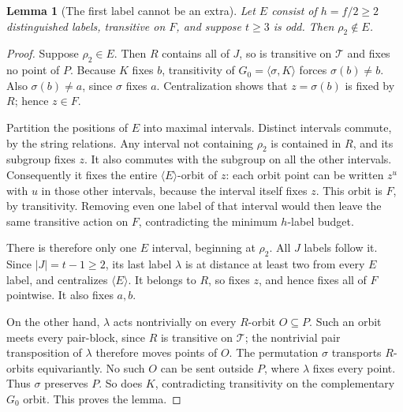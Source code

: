 \documentclass[11pt,a4paper]{article}
\newtheorem{lemma}{Lemma}
\newcommand{\gen}[1]{\langle#1\rangle}
\begin{document}
\begin{lemma}[The first label cannot be an extra]\label{near}
Let $E$ consist of $h=f/2\geq2$ distinguished labels, transitive on $F$,
and suppose $t\geq3$ is odd.
Then $\rho_2\notin E$.
\end{lemma}
\begin{proof}
Suppose $\rho_2\in E$. Then $R$ contains all of $J$, so is transitive
on $\mathcal T$ and fixes no point of $P$. Because $K$ fixes $b$,
transitivity of $G_0=\gen{\sigma,K}$ forces $\sigma(b)\ne b$.
Also $\sigma(b)\ne a$, since $\sigma$ fixes $a$. Centralization
shows that $z=\sigma(b)$ is fixed by $R$; hence $z\in F$.

Partition the positions of $E$ into maximal intervals. Distinct
intervals commute, by the string relations. Any interval not containing
$\rho_2$ is contained in $R$, and its subgroup fixes $z$. It also
commutes with the subgroup on all the other intervals. Consequently
it fixes the entire $\gen{E}$-orbit of $z$: each orbit point can be
written $z^u$ with $u$ in those other intervals, because the interval
itself fixes $z$. This orbit is $F$, by transitivity. Removing even one
label of that interval would then leave the same transitive action on
$F$, contradicting the minimum $h$-label budget.

There is therefore only one $E$ interval, beginning at $\rho_2$.
All $J$ labels follow it. Since $|J|=t-1\geq2$, its last label
$\lambda$ is at distance at least two from every $E$ label, and
centralizes $\gen{E}$. It belongs to $R$, so fixes $z$, and hence
fixes all of $F$ pointwise. It also fixes $a,b$.

On the other hand, $\lambda$ acts nontrivially on every $R$-orbit
$O\subseteq P$. Such an orbit meets every pair-block, since $R$ is
transitive on $\mathcal T$; the nontrivial pair transposition of
$\lambda$ therefore moves points of $O$. The permutation $\sigma$
transports $R$-orbits equivariantly. No such $O$ can be sent outside
$P$, where $\lambda$ fixes every point. Thus $\sigma$ preserves $P$.
So does $K$, contradicting transitivity on the complementary $G_0$
orbit. This proves the lemma.
\end{proof}
\end{document}
